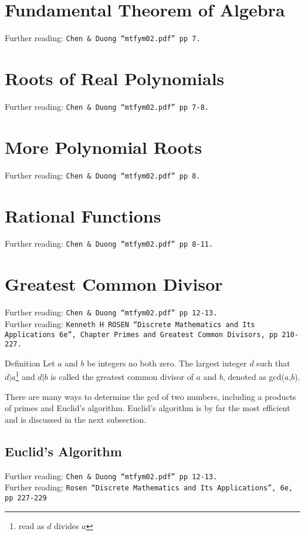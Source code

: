 \section{Fundamental Theorem of Algebra}
\label{sec:P Fundamental Theorem of Algebra}
Further reading: \texttt{Chen \& Duong ``mtfym02.pdf'' pp 7.}

\section{Roots of Real Polynomials}
\label{sec:P Roots of Real Polynomial}
Further reading: \texttt{Chen \& Duong ``mtfym02.pdf'' pp 7-8.}

\section{More Polynomial Roots}
\label{sec:P More Polynomial Root}
Further reading: \texttt{Chen \& Duong ``mtfym02.pdf'' pp 8.}

\section{Rational Functions}
\label{sec:P Rational Functions}
Further reading: \texttt{Chen \& Duong ``mtfym02.pdf'' pp 8-11.}

\section{Greatest Common Divisor}
\label{sec:P Greatest Common Divisor}
Further reading: \texttt{Chen \& Duong ``mtfym02.pdf'' pp 12-13.} \\
Further reading: \texttt{Kenneth H ROSEN ``Discrete Mathematics and Its
Applications 6e'', Chapter Primes and Greatest Common Divisors, pp 210-227.}
\begin{remember}{Definition}
  Let $a$ and $b$ be integers no both zero. The largest integer $d$ such that
  $d | a$\footnote{read as $d$ divides $a$} and $d | b$ is called the greatest
  common divisor of $a$ and $b$, denoted as gcd($a$,$b$).
\end{remember}

There are many ways to determine the gcd of two numbers, including a products of
primes and Euclid's algorithm. Euclid's algorithm is by far the most efficient
and is discussed in the next subsection.

\subsection{Euclid's Algorithm}
\label{sec:P Euclid's Algortihm}
Further reading: \texttt{Chen \& Duong ``mtfym02.pdf'' pp 12-13.}\\
Further reading: \texttt{Rosen ``Discrete Mathematics and Its Applications'', 6e, pp 227-229}\\[0.5cm]

